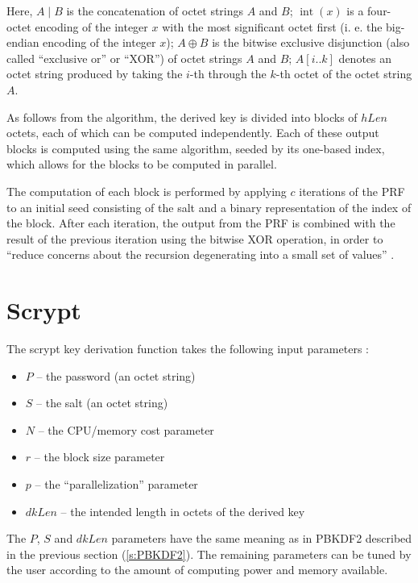 \documentclass[12pt,oneside]{fithesis2}
\begin{document}
      Here, $A \mid B$ is the concatenation of octet strings $A$ and $B$; $\operatorname{int}(x)$ is a four-octet encoding of the integer $x$ with the most significant octet first (i. e. the big-endian encoding of the integer $x$); $A \oplus B$ is the bitwise exclusive disjunction (also called ``exclusive or'' or ``XOR'') of octet strings $A$ and $B$; $A[i..k]$ denotes an octet string produced by taking the $i$-th through the $k$-th octet of the octet string $A$.
      
      As follows from the algorithm, the derived key is divided into blocks of $hLen$ octets, each of which can be computed independently. Each of these output blocks is computed using the same algorithm, seeded by its one-based index, which allows for the blocks to be computed in parallel.
      
      The computation of each block is performed by applying $c$ iterations of the PRF to an initial seed consisting of the salt and a binary representation of the index of the block. After each iteration, the output from the PRF is combined with the result of the previous iteration using the bitwise XOR operation, in order to ``reduce concerns about the recursion degenerating into a small set of values'' \cite[section 5.2]{rfc2898}.
      
      \section{Scrypt} \label{s:scrypt}
      The scrypt key derivation function takes the following input parameters \cite[chapter 7]{scrypt}:
      \begin{itemize}
        \item $P$ -- the password (an octet string)
        \item $S$ -- the salt (an octet string)
        \item $N$ -- the CPU/memory cost parameter
        \item $r$ -- the block size parameter
        \item $p$ -- the ``parallelization'' parameter
        \item $dkLen$ -- the intended length in octets of the derived key
      \end{itemize}
      
      The $P$, $S$ and $dkLen$ parameters have the same meaning as in PBKDF2 described in the previous section (\ref{s:PBKDF2}). The remaining parameters can be tuned by the user according to the amount of computing power and memory available.
\end{document}
